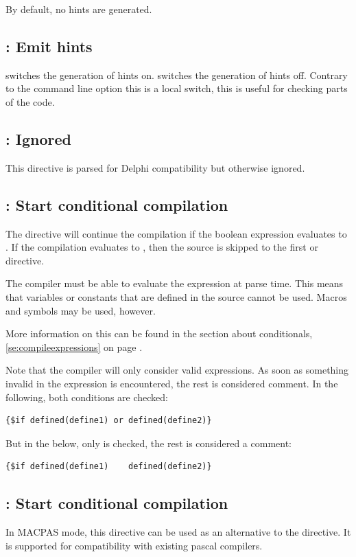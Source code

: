 By default, no hints are generated.

\subsection{ : Emit hints}

 switches the generation of hints on.
 switches the generation of hints off.
Contrary to the command line option  this is a local switch,
this is useful for checking parts of the code.

\subsection{: Ignored}
This directive is parsed for Delphi compatibility but otherwise ignored.

\subsection{ : Start conditional compilation}

The directive  will continue the compilation
if the boolean expression  evaluates to . If the
compilation evaluates to , then the source is skipped to the first
 or  directive.

The compiler must be able to evaluate the expression at parse time.
This means that variables or constants that are defined in
the source cannot be used. Macros and symbols may be used, however.

More information on this can be found in the section about
conditionals, \ref{se:compileexpressions} on page \pageref{se:compileexpressions}.

Note that the compiler will only consider valid expressions. As soon as
something invalid in the expression is encountered, the rest is considered
comment. In the following, both conditions are checked:
\begin{verbatim}
{$if defined(define1) or defined(define2)}
\end{verbatim}
But in the below, only  is checked, the rest is considered a
comment:
\begin{verbatim}
{$if defined(define1)    defined(define2)}
\end{verbatim}

\subsection{ : Start conditional compilation}
In MACPAS mode, this directive can be used as an alternative to the 
directive. It is supported for compatibility with existing \macos pascal
compilers.


